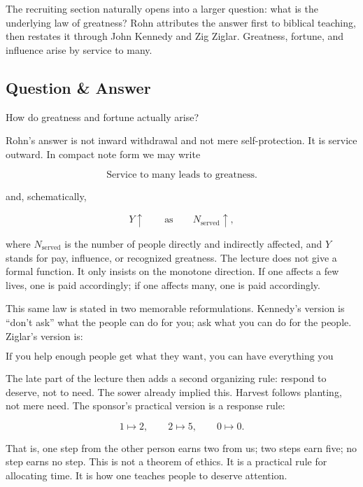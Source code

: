 The recruiting section naturally opens into a larger question: what is the underlying law of greatness? Rohn attributes the answer first to biblical teaching, then restates it through John Kennedy and Zig Ziglar. Greatness, fortune, and influence arise by service to many.

\subsection{Question \& Answer}

How do greatness and fortune actually arise?

Rohn's answer is not inward withdrawal and not mere self-protection. It is service outward. In compact note form we may write

\begin{equation}
\text{Service to many leads to greatness.}
\end{equation}

and, schematically,

\begin{equation}
Y \uparrow \qquad \text{as} \qquad N_{\mathrm{served}} \uparrow,
\end{equation}

where \(N_{\mathrm{served}}\) is the number of people directly and indirectly affected, and \(Y\) stands for pay, influence, or recognized greatness. The lecture does not give a formal function. It only insists on the monotone direction. If one affects a few lives, one is paid accordingly; if one affects many, one is paid accordingly.

This same law is stated in two memorable reformulations. Kennedy's version is ``don't ask'' what the people can do for you; ask what you can do for the people. Ziglar's version is:

\begin{equation}
\text{If you help enough people get what they want, you can have everything you want.}
\end{equation}

The late part of the lecture then adds a second organizing rule: respond to deserve, not to need. The sower already implied this. Harvest follows planting, not mere need. The sponsor's practical version is a response rule:

\begin{equation}
1 \mapsto 2,\qquad 2 \mapsto 5,\qquad 0 \mapsto 0.
\end{equation}

That is, one step from the other person earns two from us; two steps earn five; no step earns no step. This is not a theorem of ethics. It is a practical rule for allocating time. It is how one teaches people to deserve attention.

